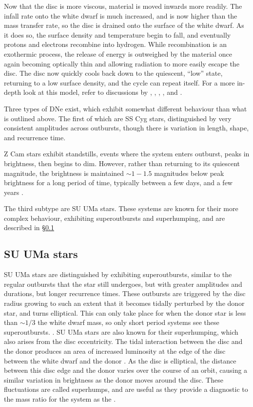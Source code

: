 Now that the disc is more viscous, material is moved inwards more readily. The infall rate onto the white dwarf is much increased, and is now higher than the mass transfer rate, so the disc is drained onto the surface of the white dwarf. As it does so, the surface density and temperature begin to fall, and eventually protons and electrons recombine into hydrogen. While recombination is an exothermic process, the release of energy is outweighed by the material once again becoming optically thin and allowing radiation to more easily escape the disc. The disc now quickly cools back down to the quiescent, ``low'' state, returning to a low surface density, and the cycle can repeat itself. For a more in-depth look at this model, refer to discussions by \citet{cannizzo1993}, \citet{osaki1996}, \citet{warner1995}, \citep{hellier2001}, and \citet{Hameury2002}.

Three types of DNe exist, which exhibit somewhat different behaviour than what is outlined above. The first of which are SS Cyg stars, distinguished by very consistent amplitudes across outbursts, though there is variation in length, shape, and recurrence time.

Z Cam stars exhibit standstills, events where the system enters outburst, peaks in brightness, then begins to dim. However, rather than returning to its quiescent magnitude, the brightness is maintained $\sim 1-1.5$ magnitudes below peak brightness for a long period of time, typically between a few days, and a few years \citep{simonsen2014}.

The third subtype are SU UMa stars. These systems are known for their more complex behaviour, exhibiting superoutbursts and superhumping, and are described in \S\ref{sect:introduction:SU UMa}

\subsection{SU UMa stars}
\label{sect:introduction:SU UMa}

SU UMa stars are distinguished by exhibiting superoutbursts, similar to the regular outbursts that the star still undergoes, but with greater amplitudes and durations, but longer recurrence times. These outbursts are triggered by the disc radius growing to such an extent that it becomes tidally perturbed by the donor star, and turns elliptical. This can only take place for when the donor star is less than $\sim 1/3$ the white dwarf mass, so only short period systems see these superoutbursts. \citep{hellier2001}. 
SU UMa stars are also known for their superhumping, which also arises from the disc eccentricity. The tidal interaction between the disc and the donor produces an area of increased luminosity at the edge of the disc between the white dwarf and the donor \citep{warner1988}. As the disc is elliptical, the distance between this disc edge and the donor varies over the course of an orbit, causing a similar variation in brightness as the donor moves around the disc.
These fluctuations are called superhumps, and are useful as they provide a diagnostic to the mass ratio for the system as the  \citep{Patterson1998, Patterson2001, patterson2005}. 

